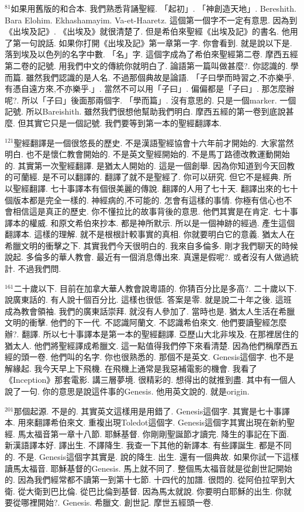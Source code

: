 \documentclass{book}
\begin{document}
$^{81}$如果用舊版的和合本.
我們熟悉背誦聖經.
「起初」.
「神創造天地」.
Bereshith.
Bara Elohim.
Ekhashamayim.
Va-et-Haaretz.
這個第一個字不一定有意思.
因為到《出埃及記》.
《出埃及》就很清楚了.
但是希伯來聖經《出埃及記》的書名.
他用了第一句說話.
如果你打開《出埃及記》第一章第一字.
你會看到.
就是說以下是.
落到埃及以色列的名字中數.
「名」字.
這個字成為了希伯來聖經第二卷.
摩西五經第二卷的記號.
用我們中文的傳統你就明白了.
論語第一篇叫做甚麼?.
你認識的.
學而篇.
雖然我們認識的是人名.
不過那個典故是論語.
「子曰學而時習之,不亦樂乎,有憑自遠方來,不亦樂乎.」.
當然不可以用「子曰」.
偏偏都是「子曰」.
那怎麼辦呢?.
所以「子曰」後面那兩個字.
「學而篇」.
沒有意思的.
只是一個marker.
一個記號.
所以Bareishith.
雖然我們很想他幫助我們明白.
摩西五經的第一卷到底說甚麼.
但其實它只是一個記號.
我們要等到第一本的聖經翻譯本.

$^{121}$聖經翻譯是一個很悠長的歷史.
不是漢語聖經協會十六年前才開始的.
大家當然明白.
也不是懷仁教會開始的.
不是英文聖經開始的.
不是馬丁路德改教運動開始的.
其實第一次聖經翻譯.
是猶太人開始的.
這是一個創舉.
因為你知道到今天回教的可蘭經.
是不可以翻譯的.
翻譯了就不是聖經了.
你可以研究.
但它不是經典.
所以聖經翻譯.
七十事譯本有個很美麗的傳說.
翻譯的人用了七十天.
翻譯出來的七十個版本都是完全一樣的.
神經病的,不可能的.
怎會有這樣的事情.
你極有信心也不會相信這是真正的歷史.
你不懂拉比的故事背後的意思.
他們其實是在肯定.
七十事譯本的權威.
和原文希伯來抄本.
都是神所默示.
所以是一個神跡的經過.
產生這個翻譯本.
這樣的理解.
就不是根根計較事實的真相.
你就要明白它的意義.
猶太人在希臘文明的衝擊之下.
其實我們今天很明白的.
我來自多倫多.
剛才我們聊天的時候說起.
多倫多的華人教會.
最近有一個消息傳出來.
真還是假呢?.
或者沒有人做過統計.
不過我們問.

$^{161}$二十歲以下.
目前在加拿大華人教會說粵語的.
你猜百分比是多高?.
二十歲以下.
說廣東話的.
有人說十個百分比.
這樣也很低.
答案是零.
就是說二十年之後.
這班成為教會領袖.
我們的廣東話崇拜.
就沒有人參加了.
當時也是.
猶太人生活在希臘文明的衝擊.
他們的下一代.
不認識阿蘭文.
不認識希伯來文.
他們要讀聖經怎麼辦?.
翻譯.
所以七十事譯本是第一本的聖經翻譯.
亞歷山大北非埃及.
在那裡居住的猶太人.
他們將聖經譯成希臘文.
這一點值得我們停下來看清楚.
因為他們稱摩西五經的頭一卷.
他們叫的名字.
你也很熟悉的.
那個不是英文.
Genesis這個字.
也不是解緣起.
我今天早上下飛機.
在飛機上通常是我惡補電影的機會.
我看了《Inception》那套電影.
講三層夢境.
很精彩的.
想得出的就推到盡.
其中有一個人說了一句.
你的意思是說這件事的Genesis.
他用英文說的.
就是origin.

$^{201}$那個起源.
不是的.
其實英文這樣用是用錯了.
Genesis這個字.
其實是七十事譯本.
用來翻譯希伯來文.
重複出現Toledot這個字.
Genesis這個字其實出現在新約聖經.
馬太福音第一章十八節.
耶穌基督.
你剛剛聖誕節才讀完.
降生的事記在下面.
新漢語譯本好.
譯出生.
不譯降生.
我查一下其他的新譯本.
有些譯誕生.
都是不同的.
不是.
Genesis這個字其實是.
說的降生.
出生.
還有一個典故.
如果你試一下這樣讀馬太福音.
耶穌基督的Genesis.
馬上就不同了.
整個馬太福音就是從創世記開始的.
因為我們經常都不讀第一到第十七節.
十四代的加譜.
很悶的.
從阿伯拉罕到大衛.
從大衛到巴比倫.
從巴比倫到基督.
因為馬太就說.
你要明白耶穌的出生.
你就要從哪裡開始?.
Genesis.
希臘文.
創世記.
摩世五經頭一卷.
\end{document}
